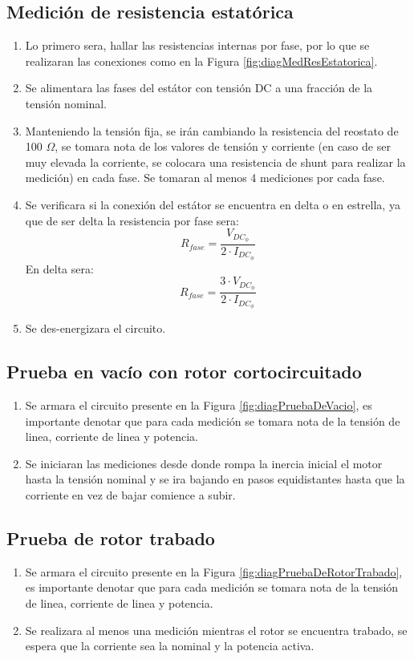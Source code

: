 \documentclass[11pt,letterpaper]{article}     %
\begin{document}
\subsection{Medición de resistencia estatórica}
\begin{enumerate}
	\item Lo primero sera, hallar las resistencias internas por fase, por lo que se realizaran las conexiones como en la Figura \ref{fig:diagMedResEstatorica}.
	\item Se alimentara las fases del estátor con tensión DC a una fracción de la tensión nominal.
	\item Manteniendo la tensión fija, se irán cambiando la resistencia del reostato de 100 $\Omega$, se tomara nota de los valores de tensión y corriente (en caso de ser muy elevada la corriente, se colocara una resistencia de shunt para realizar la medición) en cada fase. Se tomaran al menos 4 mediciones por cada fase.
	\item Se verificara si la conexión del estátor se encuentra en delta o en estrella, ya que de ser delta la resistencia por fase sera:
	\begin{equation}
	R_{fase} = \frac{V_{DC_{\phi}}}{2\cdot I_{DC_{\phi}}}
	\end{equation} 
	En delta sera:
	\begin{equation}
	R_{fase} = \frac{3\cdot V_{DC_{\phi}}}{2\cdot I_{DC_{\phi}}}
	\end{equation} 
	\item Se des-energizara el circuito.
\end{enumerate}
\subsection{Prueba en vacío con rotor cortocircuitado}
\begin{enumerate}
	\item Se armara el circuito presente en la Figura \ref{fig:diagPruebaDeVacio}, es importante denotar que para cada medición se tomara nota de la tensión  de linea, corriente de linea y potencia.
	\item Se iniciaran las mediciones desde donde rompa la inercia inicial el motor hasta la tensión nominal y se ira bajando en pasos equidistantes hasta que la corriente en vez de bajar comience a subir.
\end{enumerate}
\subsection{Prueba de rotor trabado}
\begin{enumerate}
	\item Se armara el circuito presente en la Figura \ref{fig:diagPruebaDeRotorTrabado}, es importante denotar que para cada medición se tomara nota de la tensión  de linea, corriente de linea y potencia.
	\item Se realizara al menos una medición mientras el rotor se encuentra trabado, se espera que la corriente sea la nominal y la potencia activa.
\end{enumerate}
\end{document}
